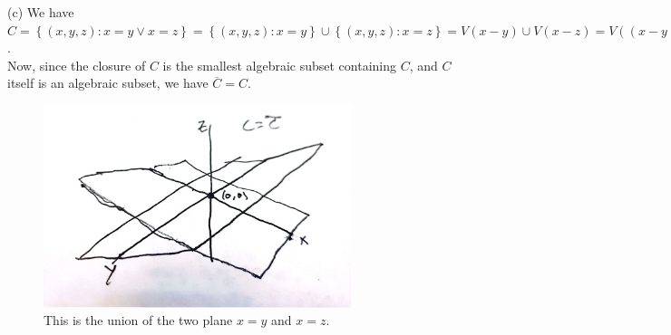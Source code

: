 \documentclass[a4paper]{article}
\begin{document}
    (c) We have
    $C = \left\{ \left( x,y,z \right)  \colon x = y \lor x = z \right\} 
    = \left\{ (x,y,z)  \colon x= y \right\} \cup 
    \left\{ (x,y,z)  \colon x = z \right\} 
    = V(x-y) \cup V\left( x-z \right)
    = V\left( (x-y)(x-z) \right) $.\\
    Now, since the closure of $C$ is the smallest algebraic
    subset containing $C$, and $C$ itself is an algebraic subset, we have
    $\overline{C} = C$.
\begin{figure}[H]
    \centering
    \includegraphics[width=0.8\textwidth]{3.jpg}
    \caption{This is the union of the two plane $x=y$ and $x=z$.}
    \label{fig:3-jpg}
\end{figure}


\newpage
\end{document}
